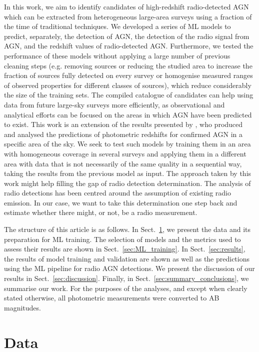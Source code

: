 \documentclass{aa}
\begin{document}
In this work, we aim to identify candidates of high-redshift radio-detected AGN which can be extracted from heterogeneous large-area surveys using a fraction of the time of traditional techniques. We developed a series of ML models to predict, separately, the detection of AGN, the detection of the radio signal from AGN, and the redshift values of radio-detected AGN. Furthermore, we tested the performance of these models without applying a large number of previous cleaning steps (e.g. removing sources or reducing the studied area to increase the fraction of sources fully detected on every survey or homogenise measured ranges of observed properties for different classes of sources), which reduce considerably the size of the training sets. The compiled catalogue of candidates can help using data from future large-sky surveys more efficiently, as observational and analytical efforts can be focused on the areas in which AGN have been predicted to exist. This work is an extension of the results presented by \citet{2021Galax...9...86C}, who produced and analysed the predictions of photometric redshifts for confirmed AGN in a specific area of the sky. We seek to test such models by training them in an area with homogeneous coverage in several surveys and applying them in a different area with data that is not necessarily of the same quality in a sequential way, taking the results from the previous model as input. The approach taken by this work might help filling the gap of radio detection determination. The analysis of radio detections has been centred around the assumption of existing radio emission. In our case, we want to take this determination one step back and estimate whether there might, or not, be a radio measurement.

The structure of this article is as follows. In Sect.~\ref{sec:data}, we present the data and its preparation for ML training. The selection of models and the metrics used to assess their results are shown in Sect.~\ref{sec:ML_training}. In Sect.~\ref{sec:results}, the results of model training and validation are shown as well as the predictions using the ML pipeline for radio AGN detections. We present the discussion of our results in Sect.~\ref{sec:discussion}. Finally, in Sect.~\ref{sec:summary_conclusions}, we summarise our work. For the purposes of the analyses, and except when clearly stated otherwise, all photometric measurements were converted to AB magnitudes.

\section{Data}\label{sec:data}
\end{document}
